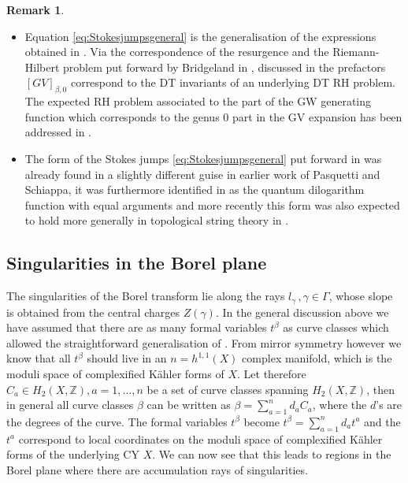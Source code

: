 \documentclass[a4paper,12pt,justification=centering]{article}
\numberwithin{equation}{section}
\theoremstyle{plain}%
\theoremstyle{definition}
\newtheorem{rem}[thm]{Remark}
\begin{document}
\begin{rem}
\begin{itemize}
\item Equation \eqref{eq:Stokesjumpsgeneral} is the generalisation of the expressions obtained in \cite{Alim:2021mhp}. Via the correspondence of the resurgence and the Riemann-Hilbert problem put forward by Bridgeland in \cite{Bridgeland1,BridgelandCon},  discussed in \cite[Section 4]{Alim:2021mhp}the prefactors $[GV]_{\beta,0}$ correspond to the DT invariants of an underlying DT RH problem. The expected RH problem associated to the part of the GW generating function which corresponds to the genus $0$ part in the GV expansion has been addressed in \cite[Section 6]{Bridgeland1}.

\item The form of the Stokes jumps \eqref{eq:Stokesjumpsgeneral} put forward in \cite{Alim:2021mhp} was already found in a slightly different guise in earlier work of Pasquetti and Schiappa\cite{Pasquetti:2009jg}, it was furthermore identified in \cite[Prop. 4.7]{Alim:2022oll} as the quantum dilogarithm function with equal arguments and more recently this form was also expected to hold more generally in topological string theory in \cite{Iwaki:2023cek}.

\end{itemize}
\end{rem}

\subsection{Singularities in the Borel plane}

The singularities of the Borel transform lie along the rays  $l_{\gamma}\,,\gamma \in \Gamma$, whose slope is obtained from the central charges $Z(\gamma)$. In the general discussion above we have assumed that there are as many formal variables $t^{\beta}$ as curve classes which allowed the straightforward generalisation of \cite{Alim:2021mhp}. From mirror symmetry however we know that all $t^{\beta}$ should live in an $n=h^{1,1}(X)$ complex manifold, which is the moduli space of complexified K\"ahler forms of $X$.
Let therefore $C_a \in H_{2}(X,\mathbb{Z}), a=1,\dots,n$ be a set of curve classes spanning $H_2(X,\mathbb{Z})$, then in general all curve classes $\beta$ can be written as $\beta=\sum_{a=1}^{n} d_a C_a$, where the $d$'s are the degrees of the curve. The formal variables $t^{\beta}$ become $t^{\beta}=\sum_{a=1}^{n} d_a t^a$ and the $t^a$ correspond to local coordinates on the moduli space of complexified K\"ahler forms of the underlying CY $X$. We can now see that this leads to regions in the Borel plane where there are accumulation rays of singularities. 
\end{document}

